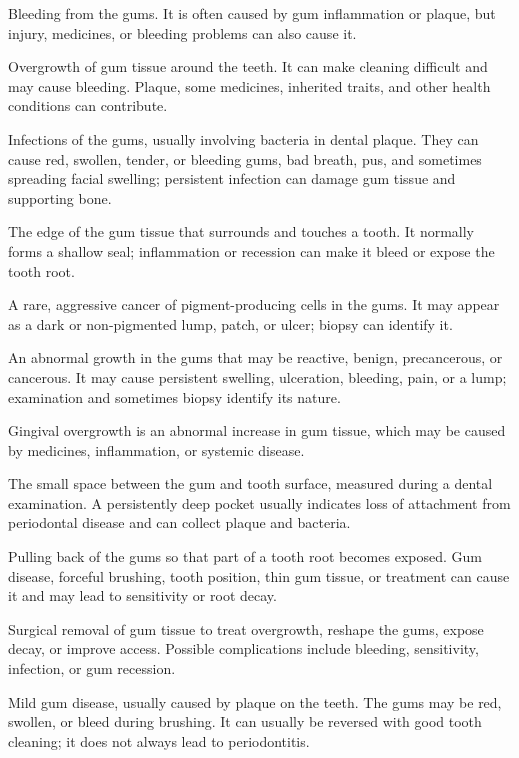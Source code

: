  Bleeding from the gums. It is often caused by gum inflammation or plaque, but injury, medicines, or bleeding problems can also cause it.

 Overgrowth of gum tissue around the teeth. It can make cleaning difficult and may cause bleeding. Plaque, some medicines, inherited traits, and other health conditions can contribute.

 Infections of the gums, usually involving bacteria in dental plaque. They can cause red, swollen, tender, or bleeding gums, bad breath, pus, and sometimes spreading facial swelling; persistent infection can damage gum tissue and supporting bone.

 The edge of the gum tissue that surrounds and touches a tooth. It normally forms a shallow seal; inflammation or recession can make it bleed or expose the tooth root.

 A rare, aggressive cancer of pigment-producing cells in the gums. It may appear as a dark or non-pigmented lump, patch, or ulcer; biopsy can identify it.

 An abnormal growth in the gums that may be reactive, benign, precancerous, or cancerous. It may cause persistent swelling, ulceration, bleeding, pain, or a lump; examination and sometimes biopsy identify its nature.

 Gingival overgrowth is an abnormal increase in gum tissue, which may be caused by medicines, inflammation, or systemic disease.

 The small space between the gum and tooth surface, measured during a dental examination. A persistently deep pocket usually indicates loss of attachment from periodontal disease and can collect plaque and bacteria.

 Pulling back of the gums so that part of a tooth root becomes exposed. Gum disease, forceful brushing, tooth position, thin gum tissue, or treatment can cause it and may lead to sensitivity or root decay.

 Surgical removal of gum tissue to treat overgrowth, reshape the gums, expose decay, or improve access. Possible complications include bleeding, sensitivity, infection, or gum recession.

 Mild gum disease, usually caused by plaque on the teeth. The gums may be red, swollen, or bleed during brushing. It can usually be reversed with good tooth cleaning; it does not always lead to periodontitis.


